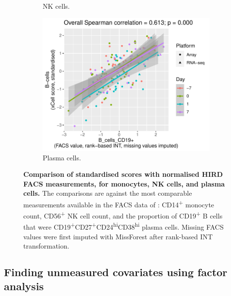 \begin{figure}
\begin{subfigure}[b]{0.43\textwidth}
        \caption{\gls{NK} cells.}
    \end{subfigure}
    \bigskip\vfill
    \begin{subfigure}[b]{0.43\textwidth}
        \centering
        \includegraphics[width=1.0\textwidth,page=2]{mainmatter/figures/chapter_03/validate_xCell_estimates.cell_type_pairs.pdf}
        \caption{Plasma cells.}
    \end{subfigure}
    \caption{
        \textbf{Comparison of standardised  scores with normalised \gls{HIRD} \gls{FACS} measurements, for monocytes, \gls{NK} cells, and plasma cells.}
        The comparisons are against the most comparable measurements available in the \gls{FACS} data of \textcite{sobolev2016AdjuvantedInfluenzaH1N1Vaccination}: 
        CD14\textsuperscript{+} monocyte count,
        CD56\textsuperscript{+} \gls{NK} cell count,
        and the proportion of CD19\textsuperscript{+} B cells that were CD19\textsuperscript{+}CD27\textsuperscript{+}CD24\textsuperscript{hi}CD38\textsuperscript{hi} plasma cells.
        Missing \gls{FACS} values were first imputed with MissForest after rank-based \gls{INT} transformation.
    }
    \label{fig:hird_xCell_vs_FACS}
\end{figure}

\subsection{Finding unmeasured covariates using factor analysis}
\label{subsec:hird_reQTL_PEER}

